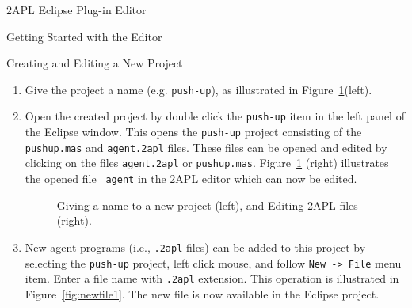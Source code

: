 \begin{chapter}{2APL Eclipse Plug-in Editor}
\begin{section}{Getting Started with the Editor}
\begin{subsection}{Creating and Editing a New Project}
\begin{enumerate}
        \item Give the project a name (e.g. \texttt{push-up}), as
        illustrated in Figure~\ref{fig:usage3}(left).

        \item Open the created project by double click the {\tt push-up} item in the left panel of the Eclipse window.
        This opens the {\tt push-up} project consisting of the \texttt{pushup.mas} and {\tt agent.2apl}
        files. These files can be opened and edited by clicking on
        the files {\tt agent.2apl} or {\tt pushup.mas}.
        Figure~\ref{fig:usage3} (right) illustrates the opened file {\tt
        agent} in the 2APL editor which can now be edited.

        \begin{figure}[ht]
            \begin{minipage}{0.3\linewidth}
                \begin{center}
                \end{center}
            \end{minipage}
            \hspace{.5cm}
            \begin{minipage}{0.6\linewidth}
            \begin{center}
            \end{center}
            \end{minipage}
        \caption{Giving a name to a new project (left), and Editing 2APL files (right).}\label{fig:usage3}
        \end{figure}

        \item New agent programs (i.e., {\tt .2apl} files) can be added to this project by
        selecting the {\tt push-up} project, left click mouse, and
        follow {\tt New -> File} menu item. Enter a file name with
        {\tt .2apl} extension. This operation is illustrated in
        Figure~\ref{fig:newfile1}. The new file is now available in the Eclipse project.


\end{enumerate}
\end{subsection}
\end{section}
\end{chapter}
